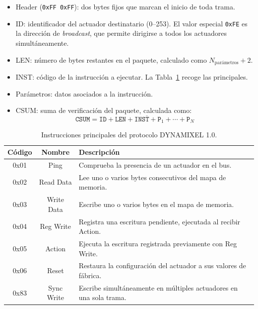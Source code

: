 \begin{itemize}
    \item Header (\texttt{0xFF 0xFF}): dos bytes fijos que marcan el inicio
    de toda trama.
    \item ID: identificador del actuador destinatario (0--253). El valor
    especial \texttt{0xFE} es la dirección de \textit{broadcast}, que permite dirigirse
    a todos los actuadores simultáneamente.
    \item LEN: número de bytes restantes en el paquete, calculado como
    $N_{\text{parámetros}} + 2$.
    \item INST: código de la instrucción a ejecutar. La Tabla~\ref{tab:dynamixel_inst}
    recoge las principales.
    \item Parámetros: datos asociados a la instrucción.
    \item CSUM: suma de verificación del paquete, calculada como:
    \vspace{+0.2\baselineskip}
    \[
    \texttt{CSUM} = \overline{\texttt{ID} + \texttt{LEN} + \texttt{INST} + \texttt{P}_1 + \cdots + \texttt{P}_N}
    \]
\end{itemize}

\vspace{-0.5\baselineskip}
\begin{table}[H]
    \centering
    \footnotesize
    \captionsetup{justification=centering}
    \renewcommand{\arraystretch}{1.25}
    \begin{tabularx}{\textwidth}{@{} >{\ttfamily}c c >{\raggedright\arraybackslash}X @{}}
        \toprule
        Código & Nombre & Descripción \\
        \midrule
        0x01 & Ping        & Comprueba la presencia de un actuador en el bus. \\
        0x02 & Read Data   & Lee uno o varios bytes consecutivos del mapa de memoria. \\
        0x03 & Write Data  & Escribe uno o varios bytes en el mapa de memoria. \\
        0x04 & Reg Write   & Registra una escritura pendiente, ejecutada al recibir Action. \\
        0x05 & Action      & Ejecuta la escritura registrada previamente con Reg Write. \\
        0x06 & Reset       & Restaura la configuración del actuador a sus valores de fábrica. \\
        0x83 & Sync Write  & Escribe simultáneamente en múltiples actuadores en una sola trama. \\
        \bottomrule
    \end{tabularx}
    \caption{Instrucciones principales del protocolo DYNAMIXEL 1.0.}
    \label{tab:dynamixel_inst}
\end{table}

